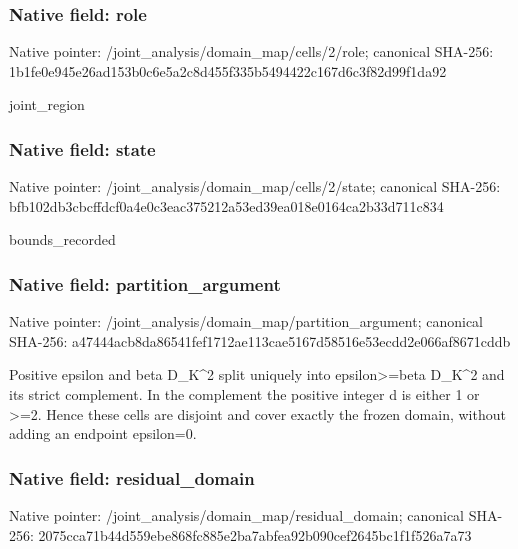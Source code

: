 \documentclass[10pt,a4paper]{article}
\begin{document}
\subsubsection{Native field: role}
Native pointer: /joint\_\allowbreak{}analysis/domain\_\allowbreak{}map/cells/2/role; canonical SHA-256: 1b1fe0e945e26ad153b0c6e5a2c8d455f335b5494422c167d6c3f82d99f1da92

\begingroup\raggedright\sloppy joint\_\allowbreak{}region\par\endgroup

\subsubsection{Native field: state}
Native pointer: /joint\_\allowbreak{}analysis/domain\_\allowbreak{}map/cells/2/state; canonical SHA-256: bfb102db3cbcffdcf0a4e0c3eac375212a53ed39ea018e0164ca2b33d711c834

\begingroup\raggedright\sloppy bounds\_\allowbreak{}recorded\par\endgroup

\subsubsection{Native field: partition\_\allowbreak{}argument}
Native pointer: /joint\_\allowbreak{}analysis/domain\_\allowbreak{}map/partition\_\allowbreak{}argument; canonical SHA-256: a47444acb8da86541fef1712ae113cae5167d58516e53ecdd2e066af8671cddb

\begingroup\raggedright\sloppy Positive epsilon and beta D\_\allowbreak{}K\textasciicircum{}2 split uniquely into epsilon>=\allowbreak{}beta D\_\allowbreak{}K\textasciicircum{}2 and its strict complement. In the complement the positive integer d is either 1 or >=\allowbreak{}2. Hence these cells are disjoint and cover exactly the frozen domain,\allowbreak{} without adding an endpoint epsilon=\allowbreak{}0.\par\endgroup

\subsubsection{Native field: residual\_\allowbreak{}domain}
Native pointer: /joint\_\allowbreak{}analysis/domain\_\allowbreak{}map/residual\_\allowbreak{}domain; canonical SHA-256: 2075cca71b44d559ebe868fc885e2ba7abfea92b090cef2645bc1f1f526a7a73
\end{document}
